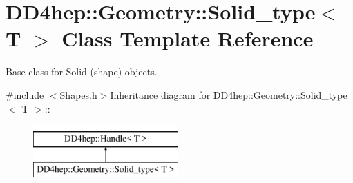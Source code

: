 \hypertarget{class_d_d4hep_1_1_geometry_1_1_solid__type}{
\section{DD4hep::Geometry::Solid\_\-type$<$ T $>$ Class Template Reference}
\label{class_d_d4hep_1_1_geometry_1_1_solid__type}
}


Base class for Solid (shape) objects.  


{\ttfamily \#include $<$Shapes.h$>$}Inheritance diagram for DD4hep::Geometry::Solid\_\-type$<$ T $>$::\begin{figure}[H]
\begin{center}
\leavevmode
\includegraphics[height=2cm]{class_d_d4hep_1_1_geometry_1_1_solid__type}
\end{center}
\end{figure}
